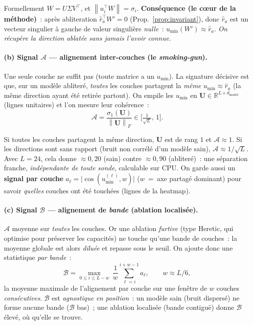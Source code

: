 \documentclass[11pt,a4paper]{article}
\theoremstyle{definition}
\theoremstyle{plain}
\newcommand{\R}{\mathbb{R}}
\newcommand{\rhat}{\hat{r}}
\newcommand{\norm}[1]{\left\lVert #1 \right\rVert}
\newcommand{\dmodel}{d_{\text{model}}}
\begin{document}
\noindent Formellement $W=U\Sigma V^\top$, et $\norm{u_i^\top W}=\sigma_i$.
\textbf{Conséquence (le cœur de la méthode)}~: après abliteration $\rhat_a^\top W'=0$
(Prop.~\ref{prop:invariant}), donc $\rhat_a$ est un vecteur singulier à gauche de
valeur singulière \emph{nulle}~: $u_{\min}(W')\approx\rhat_a$. \emph{On récupère la
direction ablatée sans jamais l'avoir connue.}

\paragraph{(b) Signal $\mathcal{A}$ — alignement inter-couches (le \emph{smoking-gun}).}
Une seule couche ne suffit pas (toute matrice a un $u_{\min}$). La signature décisive
est que, sur un modèle abliteré, \emph{toutes} les couches partagent la \emph{même}
$u_{\min}\approx\rhat_a$ (la même direction ayant été retirée partout). On empile les
$u_{\min}$ en $\mathbf{U}\in\R^{L\times\dmodel}$ (lignes unitaires) et l'on mesure leur
cohérence~:
\begin{equation}\label{eq:align}
  \mathcal{A}=\frac{\sigma_1(\mathbf{U})}{\norm{\mathbf{U}}_F}\in\Big[\tfrac{1}{\sqrt{L}},\,1\Big].
\end{equation}

\begin{intuition}
Si toutes les couches partagent la même direction, $\mathbf{U}$ est de rang $1$ et
$\mathcal{A}\approx 1$. Si les directions sont sans rapport (bruit non corrélé d'un
modèle sain), $\mathcal{A}\approx 1/\sqrt{L}$. Avec $L=24$, cela donne $\approx 0{,}20$
(sain) contre $\approx 0{,}90$ (abliteré)~: une séparation franche, \emph{indépendante
de toute sonde}, calculable sur CPU. On garde aussi un \textbf{signal par couche}
$a_\ell=\lvert\cos(u_{\min}^{(\ell)},w)\rvert$ ($w$~=~axe partagé dominant) pour savoir
\emph{quelles} couches ont été touchées (lignes de la heatmap).
\end{intuition}

\paragraph{(c) Signal $\mathcal{B}$ — alignement de \emph{bande} (ablation localisée).}
$\mathcal{A}$ moyenne sur \emph{toutes} les couches. Or une ablation \emph{furtive}
(type Heretic, qui optimise pour préserver les capacités) ne touche qu'une bande de
couches~: la moyenne globale est alors \emph{diluée} et repasse sous le seuil. On
ajoute donc une statistique \emph{par bande}~:
\begin{equation}\label{eq:band}
  \mathcal{B}=\max_{0\le i\le L-w}\ \frac1w\sum_{\ell=i}^{i+w-1} a_\ell ,
  \qquad w\approx L/6 ,
\end{equation}
la moyenne maximale de l'alignement par couche sur une fenêtre de $w$ couches
\emph{consécutives}. $\mathcal{B}$ est \emph{agnostique en position}~: un modèle sain
(bruit dispersé) ne forme aucune bande ($\mathcal{B}$ bas)~; une ablation localisée
(bande contiguë) donne $\mathcal{B}$ élevé, où qu'elle se trouve.
\end{document}

